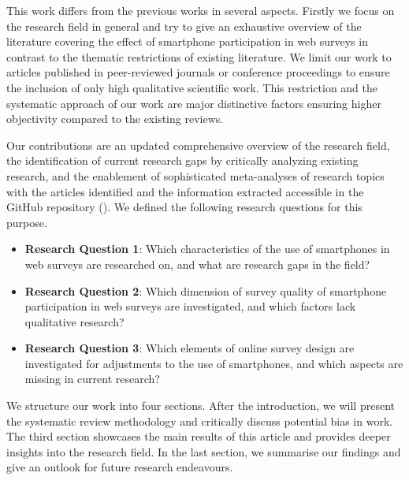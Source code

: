 This work differs from the previous works in several aspects. Firstly we focus on the research field in general and try to give an exhaustive overview of the literature covering the effect of smartphone participation in web surveys in contrast to the thematic restrictions of existing literature. We limit our work to articles published in peer-reviewed journals or conference proceedings to ensure the inclusion of only high qualitative scientific work. This restriction and the systematic approach of our work are major distinctive factors ensuring higher objectivity compared to the existing reviews.  

Our contributions are an updated comprehensive overview of the research field, the identification of current research gaps by critically analyzing existing research, and the enablement of sophisticated meta-analyses of research topics with the articles identified and the information extracted accessible in the GitHub repository (\cite{langenbahn_smartphone_2021}). We defined the following research questions for this purpose.

\begin{itemize}
   \item \textbf{Research Question 1}: Which characteristics of the use of smartphones in web surveys are researched on, and what are research gaps in the field? 
   \item \textbf{Research Question 2}: Which dimension of survey quality of smartphone participation in web surveys are investigated, and which factors lack qualitative research?
   \item \textbf{Research Question 3}: Which elements of online survey design are investigated for adjustments to the use of smartphones, and which aspects are missing in current research?
\end{itemize}

We structure our work into four sections. After the introduction, we will present the systematic review methodology and critically discuss potential bias in work. The third section showcases the main results of this article and provides deeper insights into the research field. In the last section, we summarise our findings and give an outlook for future research endeavours. 
